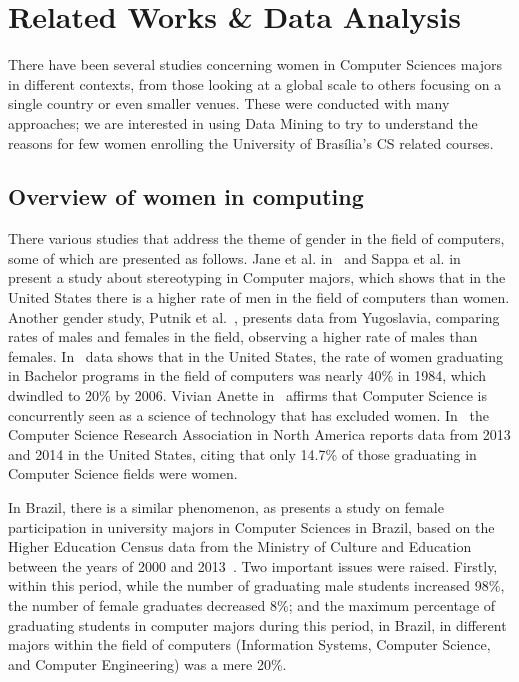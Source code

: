 \section{Related Works \& Data Analysis}\label{sec:background}%

There have been several studies concerning women in Computer Sciences majors in different contexts, from those looking at a global scale to others focusing on a single country or even smaller venues. These were conducted with many approaches; we are interested in using Data Mining to try to understand the reasons for few women enrolling the University of Brasília's CS related courses.

\subsection{Overview of women in computing}%
There various studies that address the theme of gender in the field of computers, some of which are presented as follows.
Jane et al. in~\cite{jane_2016} and Sappa et al. in~\cite{sappa_2013} present a study about stereotyping in Computer majors, which shows that in the United States there is a higher rate of men in the field of computers than women. Another gender study, Putnik et al.~\cite{zoran_2017}, presents data from Yugoslavia, comparing rates of males and females in the field, observing a higher rate of males than females. In~\cite{keinan_2017,moshe_2015} data shows that in the United States, the rate of women graduating in Bachelor programs in the field of computers was nearly 40\% in 1984, which dwindled to 20\% by 2006. Vivian Anette in~\cite{vivian_2007} affirms that Computer Science is concurrently seen as a science of technology that has excluded women. In~\cite{moshe_2015}  the Computer Science Research Association in North America reports data from 2013 and 2014 in the United States, citing that only 14.7\% of those graduating in Computer Science fields were women.

In Brazil, there is a similar phenomenon, as  presents a study on female participation in university majors in Computer Sciences in Brazil, based on the Higher Education Census data from the Ministry of Culture and Education between the years of 2000 and 2013~\cite{inep2014}. Two important issues were raised. Firstly, within this period, while the number of graduating male students increased 98\%, the number of female graduates decreased 8\%; and the maximum percentage of graduating students in computer majors during this period, in Brazil, in different majors within the field of computers (Information Systems, Computer Science, and Computer Engineering) was a mere 20\%.

